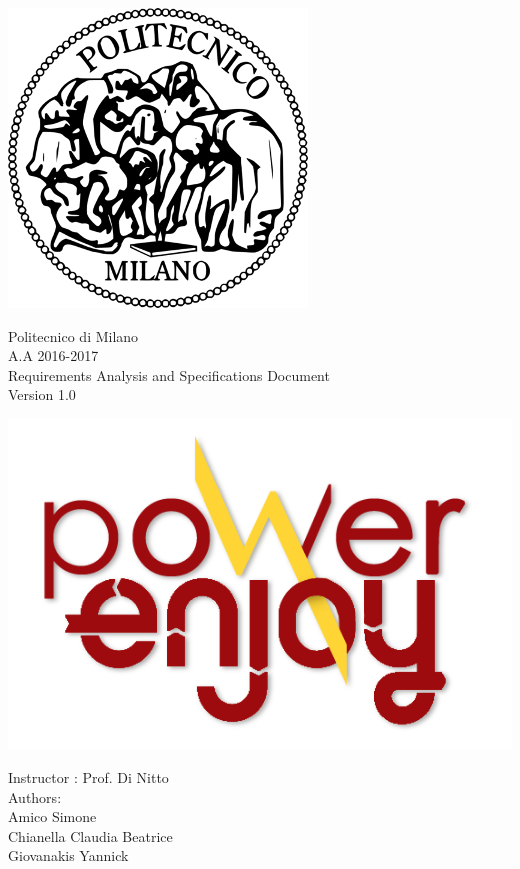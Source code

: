 \documentclass[11pt]{article}
\begin{document}
		 
	 \begin{center}
 	 	\includegraphics[scale=0.5]{Images/PolimiLogo.png}
	 \end{center}

	 \begin{center}
	 	{\Huge Politecnico di Milano}\\
	 	\vspace{5mm}
		{\Large A.A 2016-2017} 
		\vspace{5mm}\\
		{\huge Requirements Analysis and Specifications Document}   
		\vspace{5mm}\\
		{\large Version 1.0}  
     \end{center}
     
     \begin{center}
 	 	\includegraphics[scale=1]{Images/logoPowerEnjoy.png}\\
	 \end{center}
	 	\vspace{5mm}
	
	 \begin{center}
	 	{\Large Instructor : Prof. Di Nitto}
	 	\vspace{5mm}\\	 
	 	{\Large Authors:}\\
	 	{\Large Amico Simone}\\
	 	{\Large Chianella Claudia Beatrice}\\
	 	{\Large Giovanakis Yannick}
	 \end{center}
	 
	 \newpage
	 
	 \tableofcontents{}
	 
	 
     
    
     
	
\end{document}
